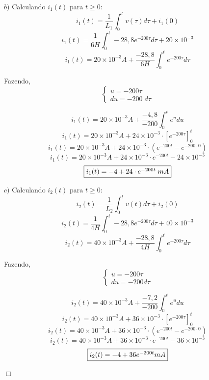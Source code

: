 \documentclass[
	12pt,				%
	oneside,			%
	a4paper,			%
	english,			%
	french,				%
	spanish,			%
	brazil				%
	]{abntex2}
\begin{document}
\newpage

$b)$ Calculando $i_1(t)$ para $t \geq 0$:
$$i_1(t) = \dfrac{1}{L_1}\int_{0}^{t} v(\tau) d\tau + i_1(0)$$
$$i_1(t) = \dfrac{1}{6H}\int_{0}^{t} -28,8e^{-200\tau} d\tau + 20\times10^{-3}$$
$$i_1(t) = 20\times10^{-3}A + \dfrac{-28,8}{6H}\int_{0}^{t} e^{-200\tau} d\tau$$

Fazendo, 
$$
\begin{cases}
u=-200\tau \\
du=-200\;d\tau
\end{cases}
$$

$$i_1(t) = 20\times10^{-3}A + \dfrac{-4,8}{-200}\int_{0}^{t} e^u du$$
$$i_1(t) = 20\times10^{-3}A + 24\times10^{-3}\cdot \left[ e^{-200\tau}\right]_0^t$$
$$i_1(t) = 20\times10^{-3}A + 24\times10^{-3}\cdot (e^{-200t} - e^{-200\cdot 0})$$
$$i_1(t) = 20\times10^{-3}A + 24\times10^{-3}\cdot e^{-200t} - 24\times10^{-3}$$
\begin{equation}
    \centering
    \fbox{$i_1(t) = -4 + 24\cdot e^{-200t}\;mA$}
\end{equation}

$c)$ Calculando $i_2(t)$ para $t \ge 0$:
$$i_2(t) = \dfrac{1}{L_2}\int_{0}^{t} v(t) d\tau + i_2(0)$$
$$i_2(t) = \dfrac{1}{4H}\int_{0}^{t} -28,8e^{-200\tau} d\tau + 40\times10^{-3}$$
$$i_2(t) = 40\times10^{-3}A + \dfrac{-28,8}{4H}\int_{0}^{t} e^{-200\tau} d\tau$$

Fazendo,
$$
\begin{cases}
u=-200\tau \\
du=-200d\tau
\end{cases}
$$

$$i_2(t) = 40\times10^{-3}A + \dfrac{-7,2}{-200}\int_{0}^{t} e^u du$$
$$i_2(t) = 40\times10^{-3}A + 36\times10^{-3}\cdot \left[ e^{-200\tau}\right]_0^t$$
$$i_2(t) = 40\times10^{-3}A + 36\times10^{-3}\cdot (e^{-200t} - e^{-200\cdot 0})$$
$$i_2(t) = 40\times10^{-3}A + 36\times10^{-3}\cdot e^{-200t} - 36\times10^{-3}$$
\begin{equation}
    \centering
    \fbox{$i_2(t) = -4 + 36e^{-200t} mA$}
\end{equation}

\begin{flushright}
    $\Box$
\end{flushright}
\newpage
\end{document}
